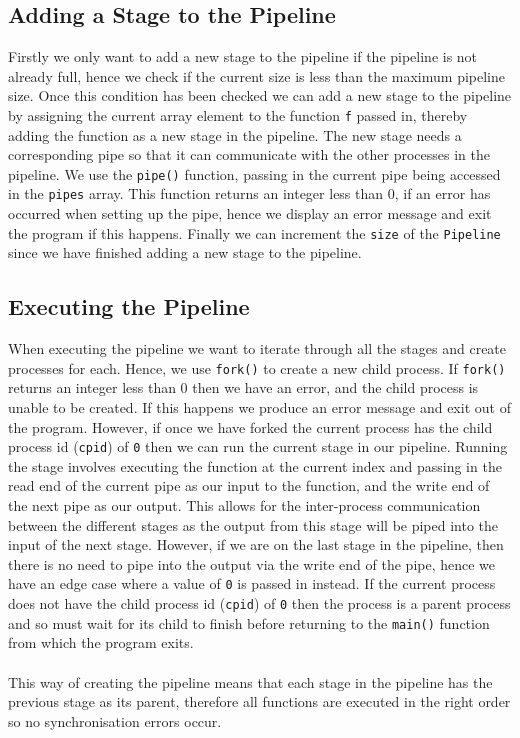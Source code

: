 \documentclass{article}
\begin{document}
    \subsection{Adding a Stage to the Pipeline}
    Firstly we only want to add a new stage to the pipeline if the pipeline is not already full, hence we check if the current size is less than the maximum pipeline size.
    Once this condition has been checked we can add a new stage to the pipeline by assigning the current array element to the function \verb+f+ passed in, thereby adding the function as a new stage in the pipeline.
    The new stage needs a corresponding pipe so that it can communicate with the other processes in the pipeline.
    We use the \verb+pipe()+ function, passing in the current pipe being accessed in the \verb+pipes+ array.
    This function returns an integer less than 0, if an error has occurred when setting up the pipe, hence we display an error message and exit the program if this happens.
    Finally we can increment the \verb+size+ of the \verb+Pipeline+ since we have finished adding a new stage to the pipeline.
    
    \subsection{Executing the Pipeline}
    When executing the pipeline we want to iterate through all the stages and create processes for each.
    Hence, we use \verb+fork()+ to create a new child process.
    If \verb+fork()+ returns an integer less than 0 then we have an error, and the child process is unable to be created.
    If this happens we produce an error message and exit out of the program.
    However, if once we have forked the current process has the child process id (\verb+cpid+) of \verb+0+ then we can run the current stage in our pipeline.
    Running the stage involves executing the function at the current index and passing in the read end of the current pipe as our input to the function, and the write end of the next pipe as our output.
    This allows for the inter-process communication between the different stages as the output from this stage will be piped into the input of the next stage.
    However, if we are on the last stage in the pipeline, then there is no need to pipe into the output via the write end of the pipe, hence we have an edge case where a value of \verb+0+ is passed in instead.
    If the current process does not have the child process id (\verb+cpid+) of \verb+0+ then the process is a parent process and so must wait for its child to finish before returning to the \verb+main()+ function from which the program exits.
    \\ \\ This way of creating the pipeline means that each stage in the pipeline has the previous stage as its parent, therefore all functions are executed in the right order so no synchronisation errors occur.
\end{document}
